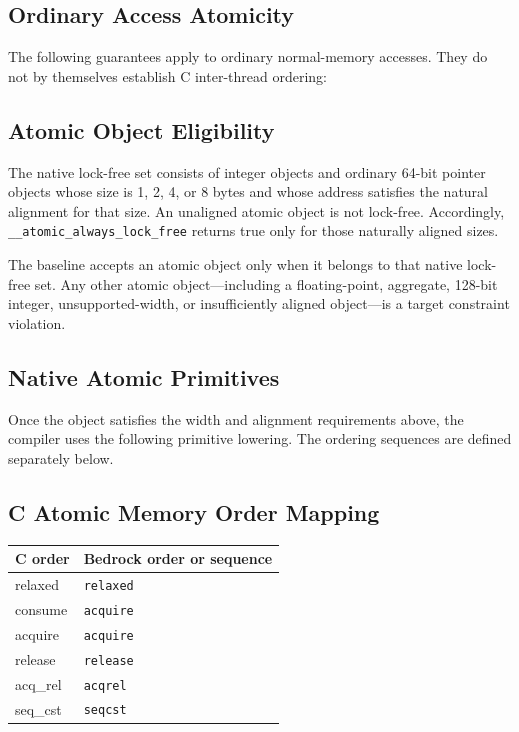 \documentclass[10pt,twoside]{article}
\begin{document}
\subsection{Ordinary Access Atomicity}
The following guarantees apply to ordinary normal-memory accesses. They do not by
themselves establish C inter-thread ordering:



\subsection{Atomic Object Eligibility}
The native lock-free set consists of integer objects and ordinary 64-bit
pointer objects whose size is 1, 2, 4, or 8 bytes and whose address satisfies
the natural alignment for that size. An unaligned atomic object is not
lock-free. Accordingly, \texttt{\_\_atomic\_always\_lock\_free} returns true
only for those naturally aligned sizes.

The baseline accepts an atomic object only when it belongs to that native
lock-free set. Any other atomic object---including a floating-point, aggregate,
128-bit integer, unsupported-width, or insufficiently aligned
object---is a target constraint violation.

\subsection{Native Atomic Primitives}
Once the object satisfies the width and alignment requirements above, the
compiler uses the following primitive lowering. The ordering sequences are
defined separately below.



\Needspace{2.6in}
\subsection{C Atomic Memory Order Mapping}
\begingroup\footnotesize
\setlength{\tabcolsep}{2pt}
\begin{longtable}{@{}p{1.55in}p{3.95in}@{}}
\toprule
\textbf{C order} & \textbf{Bedrock order or sequence}\\
\midrule
\endhead
relaxed & \texttt{relaxed}\\
consume & \texttt{acquire}\\
acquire & \texttt{acquire}\\
release & \texttt{release}\\
acq\_rel & \texttt{acqrel}\\
seq\_cst & \texttt{seqcst}\\
\bottomrule
\end{longtable}
\endgroup
\end{document}

